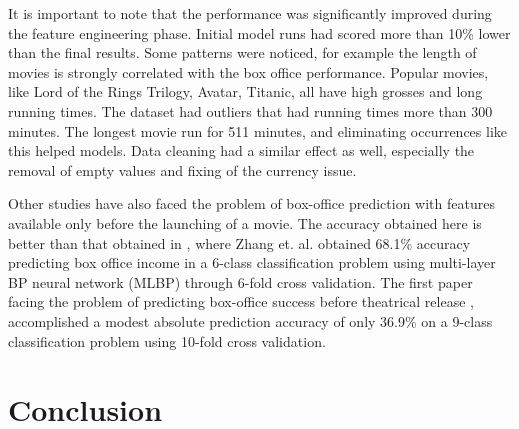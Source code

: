 It is important to note that the performance was significantly improved during the feature engineering phase. Initial model runs had scored more than 10\% lower than the final results. Some patterns were noticed, for example the length of movies is strongly correlated with the box office performance. Popular movies, like Lord of the Rings Trilogy, Avatar, Titanic, all have high grosses and long running times. The dataset had outliers that had running times more than 300 minutes. The longest movie run for 511 minutes,  and eliminating occurrences like this helped models. Data cleaning had a similar effect as well, especially the removal of empty values and fixing of the currency issue.

Other studies have also faced the problem of box-office prediction with features available only before the launching of a movie. The accuracy obtained here is better than that obtained in \cite{zhang2009forecasting}, where Zhang et. al. obtained 68.1\% accuracy predicting box office income in a 6-class classification problem using multi-layer BP neural network (MLBP) through 6-fold cross validation. The first paper facing the problem of predicting box-office success before theatrical release \cite{sharda2006predicting}, accomplished a modest absolute prediction accuracy of only 36.9\% on a 9-class classification problem using 10-fold cross validation. 



\section{Conclusion}